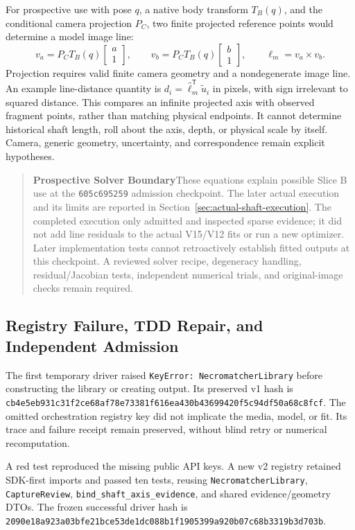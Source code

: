 \documentclass[11pt,letterpaper]{article}
\newcommand{\code}[1]{\nolinkurl{#1}}
\newcommand{\hash}[1]{{\footnotesize\nolinkurl{#1}}}
\newcommand{\note}[2]{\begin{quote}\textcolor{accent}{\textbf{#1}}\quad #2\end{quote}}
\begin{document}
For prospective use with pose $q$, a native body transform $T_B(q)$, and the
conditional camera projection $P_C$, two finite projected reference points
would determine a model image line:
\begin{equation}
 v_a=P_CT_B(q)\begin{bmatrix}a\\1\end{bmatrix},\qquad
 v_b=P_CT_B(q)\begin{bmatrix}b\\1\end{bmatrix},\qquad
 \ell_m=v_a\times v_b.
\end{equation}
Projection requires valid finite camera geometry and a nondegenerate image
line. An example line-distance quantity is
$d_i=\widehat\ell_m^\mathsf{T}\widetilde u_i$ in pixels, with sign irrelevant
to squared distance. This compares an infinite projected axis with observed
fragment points, rather than matching physical endpoints. It cannot determine
historical shaft length, roll about the axis, depth, or physical scale by
itself. Camera, generic geometry, uncertainty, and correspondence remain
explicit hypotheses.

\note{Prospective Solver Boundary}{These equations explain possible Slice B
use at the \code{605c695259} admission checkpoint. The later actual
execution and its limits are reported in Section~\ref{sec:actual-shaft-execution}. The completed execution
only admitted and inspected sparse evidence; it did not add line residuals to
the actual V15/V12 fits or run a new optimizer. Later implementation tests
cannot retroactively establish fitted outputs at this checkpoint. A reviewed
solver recipe, degeneracy handling, residual/Jacobian tests, independent
numerical trials, and original-image checks remain required.}

\subsection{Registry Failure, TDD Repair, and Independent Admission}
The first temporary driver raised \code{KeyError: NecromatcherLibrary}
before constructing the library or creating output. Its preserved v1 hash is
\hash{cb4e5eb931c31f2ce68af78e73381f616ea430b43699420f5c94df50a68c8fcf}.
The omitted orchestration registry key did not implicate the media, model,
or fit. Its trace and failure receipt remain preserved, without blind retry
or numerical recomputation.

A red test reproduced the missing public API keys. A new v2 registry
retained SDK-first imports and passed ten tests, reusing
\code{NecromatcherLibrary}, \code{CaptureReview},
\code{bind_shaft_axis_evidence}, and shared evidence/geometry DTOs.
The frozen successful driver hash is
\hash{2090e18a923a03bfe21bce53de1dc088b1f1905399a920b07c68b3319b3d703b}.
\end{document}
